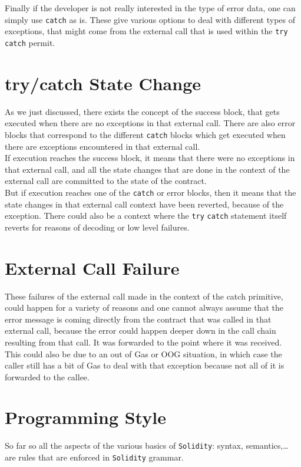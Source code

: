 Finally if the developer is not really interested in the type of error data, one can simply use \texttt{catch} as is. These give various options to deal with different types of exceptions, that might come from the external call that is used within the \texttt{try} \texttt{catch} permit.

\section{try/catch State Change}
As we just discussed, there exists the concept of the success block, that gets executed when there are no exceptions in that external call. There are also error blocks that correspond to the different \texttt{catch} blocks which get executed when there are exceptions encountered in that external call.\\

If execution reaches the success block, it means that there were no exceptions in that external call, and all the state changes that are done in the context of the external call are committed to the state of the contract.\\

But if execution reaches one of the \texttt{catch} or error blocks, then it means that the state changes in that external call context have been reverted, because of the exception. There could also be a context where the \texttt{try} \texttt{catch} statement itself reverts for reasons of decoding or low level failures.

\section{External Call Failure}
These failures of the external call made in the context of the catch primitive, could happen for a variety of reasons and one cannot always assume that the error message is coming directly from the contract that was called in that external call, because the error could happen deeper down in the call chain resulting from that call. It was forwarded to the point where it was received. \\

This could also be due to an out of Gas or OOG situation, in which case the caller still has a bit of Gas to deal with that exception because not all of it is forwarded to the callee.

\section{Programming Style}
So far so all the aspects of the various basics of \texttt{Solidity}: syntax, semantics,\dots\, are rules that are enforced in \texttt{Solidity} grammar.\\

